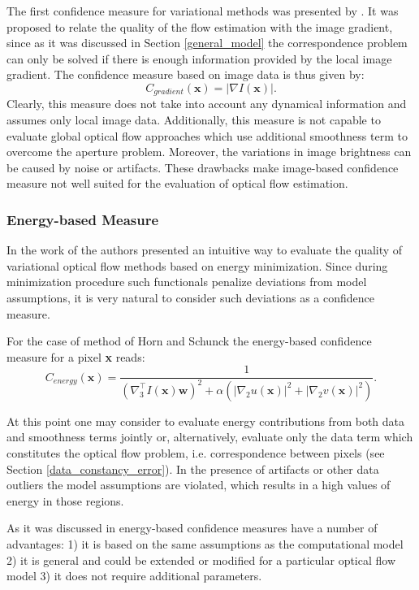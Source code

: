 The first confidence measure for variational \opticalflow methods was presented by \cite{Barron94}.
It was proposed to relate the quality of the flow estimation with the image gradient, since as it was discussed in Section \ref{general_model} the correspondence problem can only be solved if there is enough information provided by the local image gradient. The confidence measure based on image data is thus given by:
$$ C_{gradient}(\textbf{x}) = |\nabla I(\textbf{x})|. $$
Clearly, this measure does not take into account any dynamical information and assumes only local image data. Additionally, this measure is not capable to evaluate global optical flow approaches which use additional smoothness term to overcome the aperture problem. Moreover, the variations in image brightness can be caused by noise or artifacts. These drawbacks make image-based confidence measure not well suited for the evaluation of optical flow estimation.


\subsubsection{Energy-based Measure}
\label{energy_based_measure}

In the work of \cite{Bruhn06, ErshovThesis} the authors presented an intuitive way to evaluate the quality of variational optical flow methods based on energy minimization. 
Since during minimization  procedure such functionals penalize deviations from model assumptions, it is very natural to consider such deviations as a confidence measure. 

For the case of method of Horn and Schunck the energy-based confidence measure for a pixel \textbf{x} reads:
$$ C_{energy}(\textbf{x}) = \frac{1}{(\nabla_{3}^{\top}I(\textbf{x})\textbf{w})^2 + \alpha ( |\nabla_2 u(\textbf{x})|^2 + |\nabla_2 v(\textbf{x})|^2)}. $$

At this point one may consider to evaluate energy contributions from both data and smoothness terms jointly or, alternatively, evaluate only the data term which constitutes the optical flow problem, i.e. correspondence between pixels (see Section \ref{data_constancy_error}).  
In the presence of artifacts or other data outliers the model assumptions are violated, which results in a high values of energy in those regions.  

As it was discussed in \cite{Bruhn06} energy-based confidence measures have a number of advantages: 1) it is based on the same assumptions as the computational model 2) it is general and could be extended or modified for a particular optical flow model 3) it does not require additional parameters.


